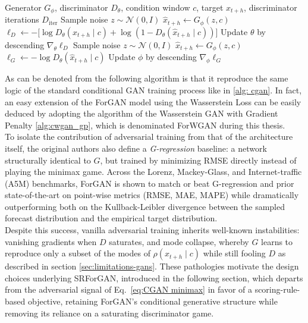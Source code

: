 \begin{algorithm}[H]
\caption{ForGAN Training (single epoch)}
\label{alg:forgan_training}
\begin{algorithmic}[1]
\REQUIRE Generator $G_\phi$, discriminator $D_\theta$, condition window $c$, target $x_{t+h}$, discriminator iterations $D_{\text{iter}}$
\STATE Sample noise $z \sim \mathcal{N}(0, I)$
\STATE $\hat{x}_{t+h} \leftarrow G_\phi(z, c)$ 
\STATE $\ell_D \leftarrow -\big[\log D_\theta(x_{t+h} \mid c) + \log(1 - D_\theta(\hat{x}_{t+h} \mid c))\big]$
\STATE Update $\theta$ by descending $\nabla_\theta \ell_D$
\ENDFOR
\STATE Sample noise $z \sim \mathcal{N}(0, I)$
\STATE $\hat{x}_{t+h} \leftarrow G_\phi(z, c)$
\STATE $\ell_G \leftarrow -\log D_\theta(\hat{x}_{t+h} \mid c)$
\STATE Update $\phi$ by descending $\nabla_\phi \ell_G$
\end{algorithmic}
\end{algorithm}
As can be denoted from the following algorithm is that 
it reproduce the same logic of the standard conditional GAN training process like in
\ref{alg: cgan}. In fact, an easy extension of the ForGAN model using the Wasserstein Loss
can be easily deduced by adopting the algorithm of the Wasserstein GAN with Gradient Penalty \ref{alg:cwgan_gp}, which is denominated ForWGAN during this thesis.\\

To isolate the contribution of adversarial training from that of the architecture itself, 
the original authors also define a \emph{G-regression} baseline: a network 
structurally identical to $G$, 
but trained by minimizing RMSE directly instead of playing the minimax game. 
Across the Lorenz, Mackey-Glass, and Internet-traffic (A5M) benchmarks, 
ForGAN is shown to match or beat G-regression and prior state-of-the-art 
on point-wise metrics (RMSE, MAE, MAPE) 
while dramatically outperforming both on the 
Kullback-Leibler divergence between the sampled 
forecast distribution and the empirical target distribution.\\
Despite this success, 
vanilla adversarial training inherits well-known 
instabilities: vanishing gradients when $D$ saturates, 
and mode collapse, 
whereby $G$ learns to reproduce only a subset of the 
modes of $\rho(x_{t+h}\mid c)$ while still fooling $D$ as described in section \ref{sec:limitations-gans}. 
These pathologies motivate the design choices underlying SRForGAN, 
introduced in the following section, 
which departs from the adversarial signal of Eq.~\ref{eq:CGAN minimax} 
in favor of a scoring-rule-based objective, 
retaining ForGAN's conditional generative structure 
while removing its reliance on a saturating discriminator game.



